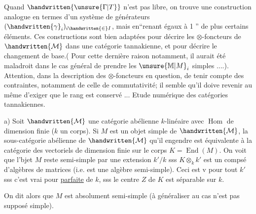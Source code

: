 Quand $\handwritten{\unsure{\Gamma|T}}$ n'est pas libre, on trouve une construction analogue en termes d'un système de générateurs $(\handwritten{\gamma}_i)_{i\handwritten{\in}I}$, mais en``renant  égaux à 1 '' de plus certains éléments. Ces constructions sont bien adaptées pour décrire les $\otimes$-foncteurs de $\handwritten{\mathcal{M}}$ dans une \deleted{$\otimes$-}catégorie tannakienne, et pour décrire le changement de base.( Pour cette dernière raison notamment, il aurait été maladroit dans le cas général de prendre les $\unsure{\mathbb{M}|M}_i$ simples ....). Attention, dans la description des $\otimes$-foncteurs en question, de tenir compte des contraintes, notamment de celle de commutativité; il semble qu'il doive revenir au même d'exiger que le rang est conservé ...
Etude numérique des catégories tannakiennes.

a) Soit $\handwritten{\mathcal{M}}$ une catégorie abélienne $k$-linéaire avec $\operatorname{Hom}$ de dimension finie ($k$ un corps). Si $M$ est un objet simple de $\handwritten{\mathcal{M}}$, la sous-catégorie abélienne de $\handwritten{\mathcal{M}}$ qu'il engendre est équivalente à la catégorie des vectoriels de dimension finie sur le corps $K=\operatorname{End}(M)$. On voit  que l'bjet $M$ reste semi-simple par une extension $k'/k$ sss $K\otimes_k k'$ est un compsé  d'algèbres de matrices (i.e. est une algèbre semi-simple). Ceci est v pour tout $k'$ sss c'est vrai pour  \uline{parfaite} de $k$,  sss le centre  $Z$ de $K$ est séparable sur $k$. On dit alors que $M$ est absolument semi-simple (à généraliser au cas n'est pas supposé simple).

